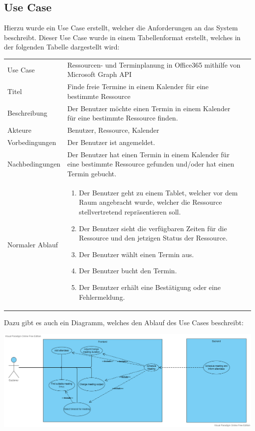 \subsection{Use Case}
Hierzu wurde ein Use Case erstellt, welcher die Anforderungen an das System beschreibt.
Dieser Use Case wurde in einem Tabellenformat erstellt, welches in der folgenden Tabelle dargestellt wird:
\newline
\begin{tabularx}{\textwidth}[b]{|l*{2}{|X}|}\hline
    \caption{Use Case - Terminbuchung}
    \label{tab:Terminbuchung}
    Use Case & Ressourcen- und Terminplanung in Office365 mithilfe von Microsoft Graph API\\

    Titel & Finde freie Termine in einem Kalender für eine bestimmte Ressource\\
    \hline
    Beschreibung & Der Benutzer möchte einen Termin in einem Kalender für eine bestimmte Ressource finden.\\
    \hline
    Akteure & Benutzer, Ressource, Kalender\\
    \hline
    Vorbedingungen & Der Benutzer ist angemeldet.\\
    \hline
    Nachbedingungen & Der Benutzer hat einen Termin in einem Kalender für eine bestimmte Ressource gefunden und/oder hat einen Termin gebucht.\\
    \hline
    Normaler Ablauf & \begin{enumerate}
        \item Der Benutzer geht zu einem Tablet, welcher vor dem Raum angebracht wurde, welcher die Ressource stellvertretend repräsentieren soll.
        \item Der Benutzer sieht die verfügbaren Zeiten für die Ressource und den jetzigen Status der Ressource.
        \item Der Benutzer wählt einen Termin aus.
        \item Der Benutzer bucht den Termin.
        \item Der Benutzer erhält eine Bestätigung oder eine Fehlermeldung.
    \end{enumerate}\\
    \hline
\end{tabularx}
\newline
\newline
Dazu gibt es auch ein Diagramm, welches den Ablauf des Use Cases beschreibt:
\newline
\newline
\par\vspace{1cm}
\centering
\includegraphics[width=\textwidth]{Bilder/Objektorientiertes Design/Use Case diagram ressource booking}
\raggedright
\newline
\newline
